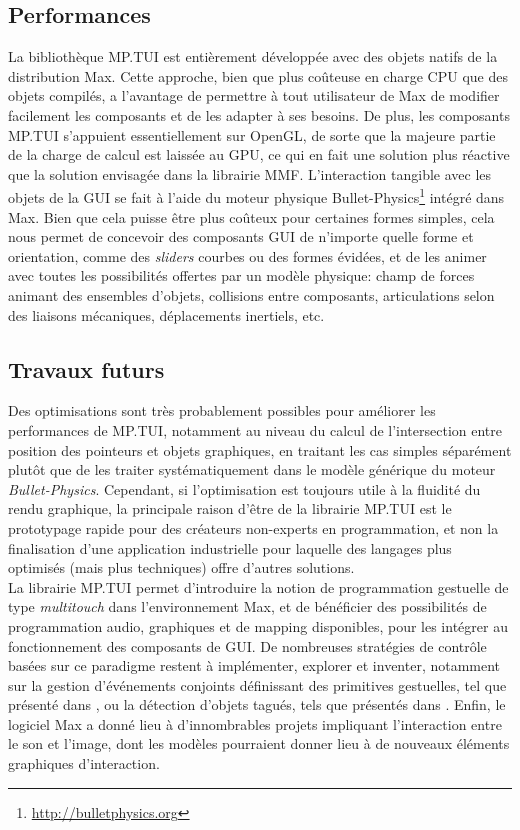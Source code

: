 \subsection{Performances}

\noindent La bibliothèque MP.TUI est entièrement développée avec des objets natifs de la distribution Max. Cette approche, bien que plus coûteuse en charge \gls{CPU} que des objets compilés, a l'avantage de permettre à tout utilisateur de Max de modifier facilement les composants et de les adapter à ses besoins. De plus, les composants MP.TUI s'appuient essentiellement sur OpenGL, de sorte que la majeure partie de la charge de calcul est laissée au \gls{GPU}, ce qui en fait une solution plus réactive que la solution envisagée dans la librairie MMF. L'interaction tangible avec les objets de la \gls{GUI} se fait à l'aide du moteur physique Bullet-Physics\footnote{\url{http://bulletphysics.org}} intégré dans Max. Bien que cela puisse être plus coûteux pour certaines formes simples, cela nous permet de concevoir des composants \gls{GUI} de n'importe quelle forme et orientation, comme des \textit{sliders} courbes ou des formes évidées, et de les animer avec toutes les possibilités offertes par un modèle physique: champ de forces animant des ensembles d'objets, collisions entre composants, articulations selon des liaisons mécaniques, déplacements inertiels, etc.

\subsection{Travaux futurs}

\noindent Des optimisations sont très probablement possibles pour améliorer les performances de MP.TUI, notamment au niveau du calcul de l'intersection entre position des pointeurs et objets graphiques, en traitant les cas simples séparément plutôt que de les traiter systématiquement dans le modèle générique du moteur \textit{Bullet-Physics}. Cependant, si l'optimisation est toujours utile à la fluidité du rendu graphique, la principale raison d'être de la librairie MP.TUI est le prototypage rapide pour des créateurs non-experts en programmation, et non la finalisation d'une application industrielle pour laquelle des langages plus optimisés (mais plus techniques) offre d'autres solutions.\\
\noindent La librairie MP.TUI permet d'introduire la notion de programmation gestuelle de type \textit{multitouch} dans l'environnement Max, et de bénéficier des possibilités de programmation audio, graphiques et de mapping disponibles, pour les intégrer au fonctionnement des composants de \gls{GUI}. De nombreuses stratégies de contrôle basées sur ce paradigme restent à implémenter, explorer et inventer, notamment sur la gestion d'événements conjoints définissant des primitives gestuelles, tel que présenté dans \cite{oney_implementing_2019}, ou la détection d'objets tagués, tels que présentés dans \cite{yu_tuic_2011}. Enfin, le logiciel Max a donné lieu à d'innombrables projets impliquant l'interaction entre le son et l'image, dont les modèles pourraient donner lieu à de nouveaux éléments graphiques d'interaction.


